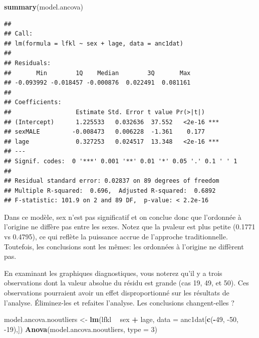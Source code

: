 \documentclass[12pt,]{book}
\makeatletter
\newenvironment{Shaded}{\begin{snugshade}}{\end{snugshade}}
\newcommand{\DataTypeTok}[1]{\textcolor[rgb]{0.13,0.29,0.53}{#1}}
\newcommand{\DecValTok}[1]{\textcolor[rgb]{0.00,0.00,0.81}{#1}}
\newcommand{\KeywordTok}[1]{\textcolor[rgb]{0.13,0.29,0.53}{\textbf{#1}}}
\newcommand{\NormalTok}[1]{#1}
\newcommand{\OperatorTok}[1]{\textcolor[rgb]{0.81,0.36,0.00}{\textbf{#1}}}
\newcommand{\StringTok}[1]{\textcolor[rgb]{0.31,0.60,0.02}{#1}}
\newenvironment{kframe}{%
\medskip{}
\setlength{\fboxsep}{.8em}
\def\at@end@of@kframe{}%
\ifinner\ifhmode%
 \def\at@end@of@kframe{\end{minipage}}%
 \begin{minipage}{\columnwidth}%
\fi\fi%
\def\FrameCommand##1{\hskip\@totalleftmargin \hskip-\fboxsep
\colorbox{incolor}{##1}\hskip-\fboxsep
    \hskip-\linewidth \hskip-\@totalleftmargin \hskip\columnwidth}%
\MakeFramed {\advance\hsize-\width
  \@totalleftmargin\z@ \linewidth\hsize
  \@setminipage}}%
{\par\unskip\endMakeFramed%
\at@end@of@kframe}
\newenvironment{rmdblock}[1]
 {
 \begin{itemize}
 \renewcommand{\labelitemi}{
   \raisebox{-.7\height}[0pt][0pt]{
     {\setkeys{Gin}{width=3em,keepaspectratio}\texttt{[image: images/\#1]}}
   }
 }
 \begin{kframe}
 \setlength{\fboxsep}{1em}
 \item
 }
 {
 \end{kframe}
 \end{itemize}
 }
\newenvironment{rmdcode}
  {\begin{rmdblock}{screen}}
  {\end{rmdblock}}
\makeatother
\begin{document}
\begin{Shaded}
\begin{Highlighting}[]
\KeywordTok{summary}\NormalTok{(model.ancova)}
\end{Highlighting}
\end{Shaded}

\begin{verbatim}
## 
## Call:
## lm(formula = lfkl ~ sex + lage, data = anc1dat)
## 
## Residuals:
##       Min        1Q    Median        3Q       Max 
## -0.093992 -0.018457 -0.000876  0.022491  0.081161 
## 
## Coefficients:
##                  Estimate Std. Error t value Pr(>|t|)    
## (Intercept)      1.225533   0.032636  37.552   <2e-16 ***
## sexMALE         -0.008473   0.006228  -1.361    0.177    
## lage             0.327253   0.024517  13.348   <2e-16 ***
## ---
## Signif. codes:  0 '***' 0.001 '**' 0.01 '*' 0.05 '.' 0.1 ' ' 1
## 
## Residual standard error: 0.02837 on 89 degrees of freedom
## Multiple R-squared:  0.696,  Adjusted R-squared:  0.6892 
## F-statistic: 101.9 on 2 and 89 DF,  p-value: < 2.2e-16
\end{verbatim}

Dans ce modèle, sex n'est pas significatif et on conclue donc que l'ordonnée à l'origine ne diffère pas entre les sexes. Notez que la pvaleur est plus petite (0.1771 vs 0.4795), ce qui reflète la puissance accrue de l'approche traditionnelle. Toutefois, les conclusions sont les mêmes: les ordonnées à l'origine ne diffèrent pas.

\begin{rmdcode}
En examinant les graphiques diagnostiques, vous noterez qu'il y a trois observations dont la valeur absolue du résidu est grande (cas 19, 49, et 50). Ces observations pourraient avoir un effet disproportionné sur les résultats de l'analyse. Éliminez-les et refaites l'analyse. Les conclusions changent-elles ?
\end{rmdcode}

\begin{Shaded}
\begin{Highlighting}[]
\NormalTok{model.ancova.nooutliers <-}\StringTok{ }\KeywordTok{lm}\NormalTok{(lfkl }\OperatorTok{~}\StringTok{ }\NormalTok{sex }\OperatorTok{+}\StringTok{ }\NormalTok{lage, }\DataTypeTok{data =}\NormalTok{ anc1dat[}\KeywordTok{c}\NormalTok{(}\OperatorTok{-}\DecValTok{49}\NormalTok{, }\DecValTok{-50}\NormalTok{, }\DecValTok{-19}\NormalTok{),])}
\KeywordTok{Anova}\NormalTok{(model.ancova.nooutliers, }\DataTypeTok{type =} \DecValTok{3}\NormalTok{)}
\end{Highlighting}
\end{Shaded}
\end{document}
